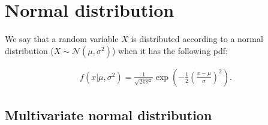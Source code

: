 \section{Normal distribution}\label{sec:normal-distribution}

We say that a random variable $X$ is distributed
according to a normal distribution ($X \sim \mathcal{N}(\mu, \sigma^2)$) when it has the following \gls{pdf}:

\begin{definition}
    \begin{align}
        \label{eq:pdf_normal_dist}
        f(x|\mu, \sigma^2) = \frac{1}{\sqrt{2\pi\sigma^2}}
        \exp{\left(-\frac{1}{2}\left(\frac{x-\mu}{\sigma}\right)^2\right)}.
    \end{align}
\end{definition}

\subsection{Multivariate normal distribution}\label{subsec:multivariate-normal-distribution}

